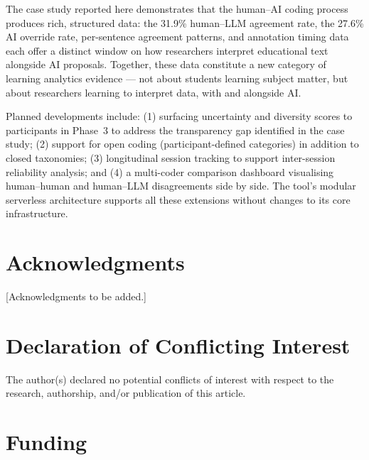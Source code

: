 \documentclass[fleqn,10pt]{JLA_article}
\begin{document}
The case study reported here demonstrates that the human--AI coding process produces rich,
structured data: the 31.9\% human--LLM agreement rate, the 27.6\% AI override rate,
per-sentence agreement patterns, and annotation timing data each offer a distinct window on
how researchers interpret educational text alongside AI proposals. Together, these data
constitute a new category of learning analytics evidence — not about students learning
subject matter, but about researchers learning to interpret data, with and alongside AI.

Planned developments include: (1) surfacing uncertainty and diversity scores to participants
in Phase~3 to address the transparency gap identified in the case study; (2) support for
open coding (participant-defined categories) in addition to closed taxonomies; (3)
longitudinal session tracking to support inter-session reliability analysis; and (4) a
multi-coder comparison dashboard visualising human--human and human--LLM disagreements
side by side. The tool's modular serverless architecture supports all these extensions
without changes to its core infrastructure.

\section*{Acknowledgments}

[Acknowledgments to be added.]

\section*{Declaration of Conflicting Interest}

The author(s) declared no potential conflicts of interest with respect to the research,
authorship, and/or publication of this article.

\section*{Funding}
\end{document}
